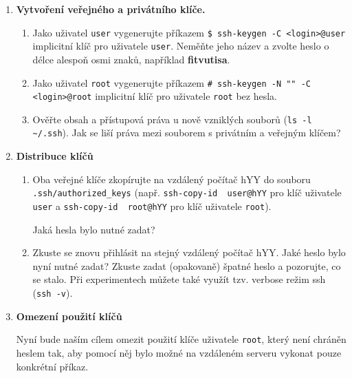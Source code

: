 \documentclass[a4paper,11pt]{article}
\begin{document}
\begin{enumerate}
  \item {\bf Vytvoření veřejného a privátního klíče.}

    \begin{enumerate}

      \item Jako uživatel {\tt user} vygenerujte příkazem \verb|$ ssh-keygen -C <login>@user|
        implicitní klíč pro uživatele
        {\tt user}. Neměňte jeho
        název a zvolte heslo o délce alespoň osmi znaků, například
        \textbf{fitvutisa}.

      \item Jako uživatel {\tt root} vygenerujte příkazem \verb|# ssh-keygen -N "" -C <login>@root|
        implicitní klíč pro uživatele {\tt root} bez hesla.

      \item Ověřte obsah a přístupová práva u nově vzniklých souborů (\verb|ls -l ~/.ssh|). Jak
se liší práva mezi souborem s privátním a veřejným klíčem?

    \end{enumerate}

  \item {\bf Distribuce klíčů}

    \begin{enumerate}

      \item Oba veřejné klíče zkopírujte na vzdálený počítač hYY do
        souboru \verb|.ssh/authorized_keys|
        (např. {\verb&ssh-copy-id  user@hYY&} pro
        klíč uživatele {\tt user}
        a {\verb&ssh-copy-id  root@hYY&} pro
        klíč uživatele {\tt root}).
        
      Jaká hesla bylo nutné zadat?

      \item Zkuste se znovu přihlásit na stejný vzdálený počítač hYY. Jaké heslo bylo nyní nutné zadat? Zkuste
        zadat (opakovaně) špatné heslo a pozorujte, co se stalo. Při experimentech můžete také
využít tzv. verbose režim ssh ({\tt ssh -v}).

    \end{enumerate}

  \item {\bf Omezení použití klíčů}

    Nyní bude naším cílem omezit použití klíče uživatele {\tt root}, který není chráněn heslem tak,
    aby pomocí něj bylo možné na vzdáleném serveru vykonat pouze konkrétní příkaz.

    \begin{enumerate}


\end{enumerate}
\end{enumerate}
\end{document}
